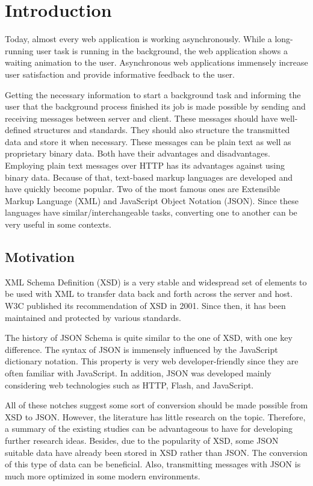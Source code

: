 \section{Introduction}
Today, almost every web application is working asynchronously. While a
long-running user task is running in the background, the web application shows a
waiting animation to the user. Asynchronous web applications immensely increase
user satisfaction and provide informative feedback to the user.

Getting the necessary information to start a background task and informing the
user that the background process finished its job is made possible by sending
and receiving messages between server and client. These messages should have
well-defined structures and standards. They should also structure the
transmitted data and store it when necessary. These messages can be plain text
as well as proprietary binary data. Both have their advantages and
disadvantages. Employing plain text messages over HTTP has its advantages
against using binary data. Because of that, text-based markup languages are
developed and have quickly become popular. Two of the most famous ones are
Extensible Markup Language (XML) and JavaScript Object Notation (JSON). Since
these languages have similar/interchangeable tasks, converting one to another
can be very useful in some contexts.

\subsection{Motivation}
XML Schema Definition (XSD) is a very stable and widespread set of elements to
be used with XML to transfer data back and forth across the server and host. W3C
published its recommendation of XSD in 2001. Since then, it has been maintained
and protected by various standards.

The history of JSON Schema is quite similar to the one of XSD, with one key
difference. The syntax of JSON is immensely influenced by the JavaScript
dictionary notation. This property is very web developer-friendly since they are
often familiar with JavaScript. In addition, JSON was developed mainly
considering web technologies such as HTTP, Flash, and JavaScript.

All of these notches suggest some sort of conversion should be made possible
from XSD to JSON. However, the literature has little research on the topic.
Therefore, a summary of the existing studies can be advantageous to have for
developing further research ideas. Besides, due to the popularity of XSD, some
JSON suitable data have already been stored in XSD rather than JSON. The
conversion of this type of data can be beneficial. Also, transmitting messages
with JSON is much more optimized in some modern environments.

